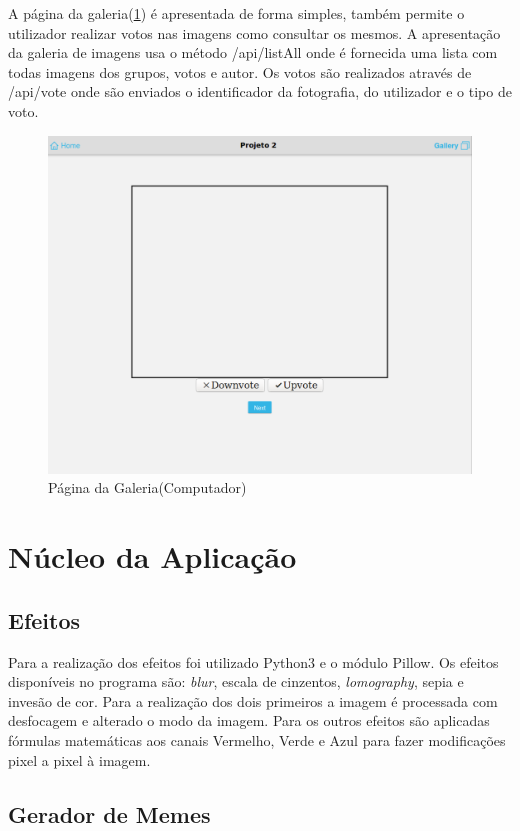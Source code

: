 \documentclass{report}
\begin{document}
A página da galeria(\ref{GalPag}) é apresentada de forma simples, também permite o utilizador realizar votos nas imagens como consultar os mesmos. A apresentação da galeria de imagens usa o método /api/listAll onde é fornecida uma lista com todas imagens dos grupos, votos e autor. Os votos são realizados através de /api/vote onde são enviados o identificador da fotografia, do utilizador e o tipo de voto.
\begin{figure}[b]
 \center
 \includegraphics[scale=0.5]{final_gallery.png}
 \caption{Página da Galeria(Computador)}
 \label{GalPag}
\end{figure}

\section{Núcleo da Aplicação}

\subsection{Efeitos}

Para a realização dos efeitos foi utilizado Python3 e o módulo Pillow.
Os efeitos disponíveis no programa são: \textit{blur}, escala de cinzentos, \textit{lomography}, sepia e invesão de cor. Para a realização dos dois primeiros a imagem é processada com desfocagem e alterado o modo da imagem. Para os outros efeitos são aplicadas fórmulas matemáticas aos canais Vermelho, Verde e Azul para fazer modificações pixel a pixel à imagem.

\subsection{Gerador de Memes}
\end{document}

